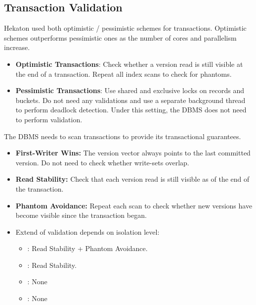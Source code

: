 \documentclass[11pt]{article}
\begin{document}
\subsection*{Transaction Validation}
Hekaton used both optimistic / pessimistic schemes for transactions. Optimistic schemes outperforms 
pessimistic ones as the number of cores and parallelism increase.

\begin{itemize}
    \item \textbf{Optimistic Transactions}:
    Check whether a version read is still visible at the 
    end of a transaction. Repeat all index scans to check for phantoms. 

    \item
    \textbf{Pessimistic Transactions}:
    Use shared and exclusive locks on records and buckets. Do 
    not need any validations and use a separate background thread to perform deadlock detection. 
    Under this setting, the DBMS does not need to perform validation.
\end{itemize}
    
The DBMS needs to scan transactions to provide its transactional guarantees.
\begin{itemize}
    \item \textbf{First-Writer Wins:}
    The version vector always points to the last committed version. Do not need to check whether 
    write-sets overlap.

    \item \textbf{Read Stability:}
    Check that each version read is still visible as of the end of 
    the transaction.
    
    \item \textbf{Phantom Avoidance:}
    Repeat each scan to check whether new versions have become visible since the transaction began.
    
    \item Extend of validation depends on isolation level:
    \begin{itemize}
        \item {}: Read Stability + Phantom Avoidance.
        \item {}: Read Stability.
        \item {}: None
        \item {}: None
    \end{itemize}
\end{itemize}
\end{document}
